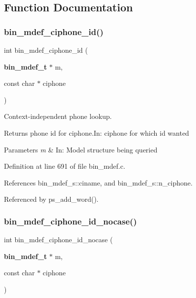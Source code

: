 \subsection{Function Documentation}
\mbox{\label{bin__mdef_8h_af592f710731474b77166a29530716672}} 
\subsubsection{bin\+\_\+mdef\+\_\+ciphone\+\_\+id()}
{\footnotesize\ttfamily int bin\+\_\+mdef\+\_\+ciphone\+\_\+id (\begin{DoxyParamCaption}\item[{\textbf{ bin\+\_\+mdef\+\_\+t} $\ast$}]{m,  }\item[{const char $\ast$}]{ciphone }\end{DoxyParamCaption})}



Context-\/independent phone lookup. 

\begin{DoxyReturn}{Returns}
phone id for ciphone.\+In\+: ciphone for which id wanted 
\end{DoxyReturn}

\begin{DoxyParams}{Parameters}
{\em m} & In\+: Model structure being queried \\
\hline
\end{DoxyParams}


Definition at line 691 of file bin\+\_\+mdef.\+c.



References bin\+\_\+mdef\+\_\+s\+::ciname, and bin\+\_\+mdef\+\_\+s\+::n\+\_\+ciphone.



Referenced by ps\+\_\+add\+\_\+word().

\mbox{\label{bin__mdef_8h_af437f39a8a9b52dd3187f7f0fc098cab}} 
\subsubsection{bin\+\_\+mdef\+\_\+ciphone\+\_\+id\+\_\+nocase()}
{\footnotesize\ttfamily int bin\+\_\+mdef\+\_\+ciphone\+\_\+id\+\_\+nocase (\begin{DoxyParamCaption}\item[{\textbf{ bin\+\_\+mdef\+\_\+t} $\ast$}]{m,  }\item[{const char $\ast$}]{ciphone }\end{DoxyParamCaption})}



